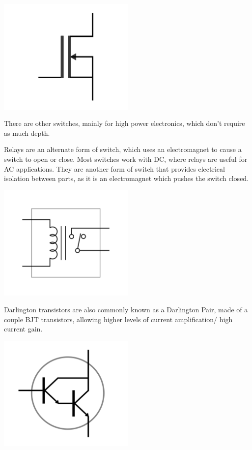 \documentclass[a4paper,11pt]{report}
\begin{document}
\includegraphics[width=0.5\textwidth]{mosfet}

There are other switches, mainly for high power electronics, which don't require as much depth.

Relays are an alternate form of switch, which uses an electromagnet to cause a switch to open or close. Most switches work with DC, where relays are useful for AC applications. They are another form of switch that provides electrical isolation between parts, as it is an electromagnet which pushes the switch closed.

\includegraphics[width=0.5\textwidth]{relay}

Darlington transistors are also commonly known as a Darlington Pair, made of a couple BJT transistors, allowing higher levels of current amplification/ high current gain.

\includegraphics[width=0.5\textwidth]{darlingtontransistor}
\end{document}
